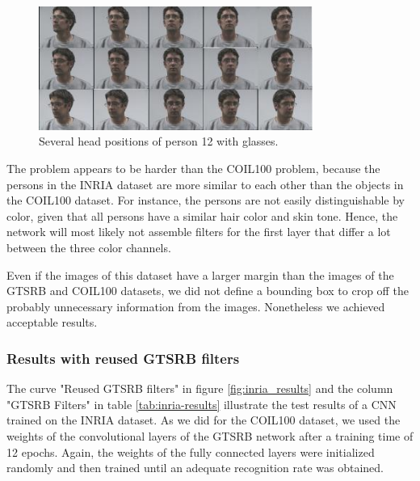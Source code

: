 \documentclass[11pt, a4paper]{article}
\begin{document}
\begin{figure}[h!]
	\centering
	\includegraphics[width=0.8\textwidth]{data_examples/inria}
	\caption{Several head positions of person 12 with glasses.}
	\label{fig:inria_different_angles}
\end{figure}

The problem appears to be harder than the COIL100 problem, because the persons in the INRIA dataset are more similar to each other than the objects in the COIL100 dataset. For instance, the persons are not easily distinguishable by color, given that all persons have a similar hair color and skin tone. Hence, the network will most likely not assemble filters for the first layer that differ a lot between the three color channels.

Even if the images of this dataset have a larger margin than the images of the GTSRB and COIL100 datasets, we did not define a bounding box to crop off the probably unnecessary information from the images. Nonetheless we achieved acceptable results.

\subsubsection{Results with reused GTSRB filters}

The curve "Reused GTSRB filters" in figure \ref{fig:inria_results} and the column "GTSRB Filters" in table \ref{tab:inria-results} illustrate the test results of a CNN trained on the INRIA dataset. As we did for the COIL100 dataset, we used the weights of the convolutional layers of the GTSRB network after a training time of 12 epochs. Again, the weights of the fully connected layers were initialized randomly and then trained until an adequate recognition rate was obtained.
\end{document}
